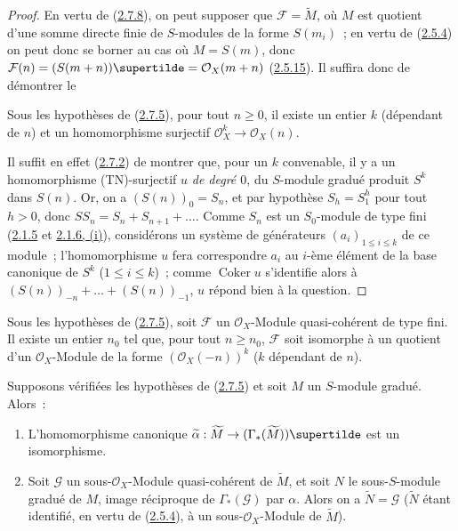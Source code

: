 \begin{proof}
En vertu de (\hyperref[II.2.7.8-fr]{2.7.8}), on peut supposer que
$\mathcal{F}=\widetilde{M}$, où $M$ est quotient d'une somme directe finie de
$S$-modules de la forme $S(m_i)$~; en vertu de
(\hyperref[II.2.5.4-fr]{2.5.4}) on peut donc se borner au cas où $M=S(m)$,
donc $\mathcal{F}(n)=(S(m+n))\supertilde
=\mathcal{O}_X(m+n)$ (\hyperref[II.2.5.15-fr]{2.5.15}). Il suffira donc de
démontrer le

\begin{lemma}[2.7.9.1]
\label{II.2.7.9.1-fr}
Sous les hypothèses de \textup{(\hyperref[II.2.7.5-fr]{2.7.5})}, pour tout $n\geq0$,
il existe un entier $k$ (dépendant de $n$) et un homomorphisme surjectif
$\mathcal{O}_X^k\to\mathcal{O}_X(n)$.
\end{lemma}

Il suffit en effet (\hyperref[II.2.7.2-fr]{2.7.2}) de montrer que, pour un $k$
convenable, il y a un homomorphisme (TN)-surjectif $u$ \emph{de degré $0$},
du $S$-module gradué produit $S^k$ dans $S(n)$. Or, on a $(S(n))_0=S_n$, et
par hypothèse $S_h=S_1^h$ pour tout $h>0$, donc
$SS_n=S_n+S_{n+1}+\ldots$. Comme $S_n$ est un $S_0$-module de type fini
(\hyperref[II.2.1.5-fr]{2.1.5} et
\hyperref[II.2.1.6-fr]{2.1.6, (i)}), considérons un système de générateurs
$(a_i)_{1\leq i\leq k}$ de ce module~; l'homomorphisme $u$ fera correspondre
$a_i$ au $i$-ème élément de la base canonique de $S^k$ ($1\leq i\leq k$)~;
comme $\operatorname{Coker}u$ s'identifie alors à
$(S(n))_{-n}+\ldots+(S(n))_{-1}$, $u$ répond bien à la question.
\end{proof}

\begin{corollary}[2.7.10]
\label{II.2.7.10-fr}
Sous les hypothèses de \textup{(\hyperref[II.2.7.5-fr]{2.7.5})}, soit $\mathcal{F}$ un
$\mathcal{O}_X$-Module quasi-cohérent de type fini. Il existe un entier $n_0$
tel que, pour tout $n\geq n_0$, $\mathcal{F}$ soit isomorphe à un quotient
d'un $\mathcal{O}_X$-Module de la forme $(\mathcal{O}_X(-n))^k$ ($k$
dépendant de $n$).
\end{corollary}

\begin{proposition}[2.7.11]
\label{II.2.7.11-fr}
Supposons vérifiées les hypothèses de
\textup{(\hyperref[II.2.7.5-fr]{2.7.5})} et soit $M$ un $S$-module gradué. Alors~:
\begin{enumerate}
  \item[\rm(i)] L'homomorphisme canonique
    $\widetilde{\alpha}:\widetilde{M}\to
    (\Gamma_*(\widetilde{M}))\supertilde$ est un isomorphisme.
  \item[\rm(ii)] Soit $\mathcal{G}$ un sous-$\mathcal{O}_X$-Module
    quasi-cohérent de $\widetilde{M}$, et soit $N$ le sous-$S$-module gradué
    de $M$, image réciproque de $\Gamma_*(\mathcal{G})$ par $\alpha$. Alors
    on a $\widetilde{N}=\mathcal{G}$ ($\widetilde{N}$ étant identifié, en
    vertu de \textup{(\hyperref[II.2.5.4-fr]{2.5.4})}, à un
    sous-$\mathcal{O}_X$-Module de $\widetilde{M}$).
\end{enumerate}
\end{proposition}


